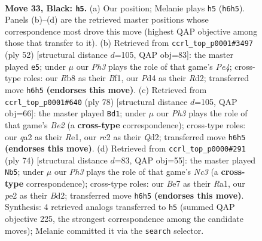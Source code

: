 \documentclass[11pt]{article}
\begin{document}
\clearpage

\begin{figure}[p]\centering
\begin{subfigure}{0.46\textwidth}\centering
\resizebox{\linewidth}{!}{%
\newchessgame
\chessboard[
  setfen={1rb3k1/p1nqbrn1/7p/P1p2p2/3p1Pp1/1P4P1/Q1R1P1BP/1RBNN1K1 b - - 5 33},
  showmover=false,
  pgfstyle=straightmove, color=movearrow, markmove={h6-h5}
]}
\caption{}
\end{subfigure}\hfill
\begin{subfigure}{0.46\textwidth}\centering
\resizebox{\linewidth}{!}{%
\newchessgame
\chessboard[
  setfen={5rk1/r2qbpp1/bnp1p2p/1p5P/3PPB2/p1P1N1P1/P1QR1P2/1R3BK1 w - - 6 27},
  showmover=false,
  pgfstyle=straightmove, color=movearrow, markmove={e4-e5}
]}
\caption{}
\end{subfigure}
\\[4pt]
\begin{subfigure}{0.46\textwidth}\centering
\resizebox{\linewidth}{!}{%
\newchessgame
\chessboard[
  setfen={r1q2nk1/3b1pb1/2pP2p1/r1p1P2p/1pP2P1P/5N2/PR1QBNK1/4R3 w - - 3 40},
  showmover=false,
  pgfstyle=straightmove, color=movearrow, markmove={e2-d1}
]}
\caption{}
\end{subfigure}\hfill
\begin{subfigure}{0.46\textwidth}\centering
\resizebox{\linewidth}{!}{%
\newchessgame
\chessboard[
  setfen={2rb1nk1/q2r1pp1/1pb1p2p/2p1P3/P1P2P1P/1RN3P1/3BQ2K/R4B2 w - - 3 38},
  showmover=false,
  pgfstyle=straightmove, color=movearrow, markmove={c3-b5}
]}
\caption{}
\end{subfigure}
\caption{\textbf{Move 33, Black: \texttt{h5}.} (a) Our position; Melanie plays \texttt{h5} (\texttt{h6h5}). Panels (b)--(d) are the retrieved master positions whose correspondence most drove this move (highest QAP objective among those that transfer to it). (b) Retrieved from \texttt{ccrl\_top\_p0001\#3497} (ply 52) [structural distance $d$=105, QAP obj=83]: the master played \texttt{e5}; under $\mu$ our \emph{Ph3} plays the role of that game's \emph{Pe4}; cross-type roles: our \emph{R}b8 as their \emph{B}f1, our \emph{P}d4 as their \emph{R}d2; transferred move \texttt{h6h5} \textbf{(endorses this move)}. (c) Retrieved from \texttt{ccrl\_top\_p0001\#640} (ply 78) [structural distance $d$=105, QAP obj=66]: the master played \texttt{Bd1}; under $\mu$ our \emph{Ph3} plays the role of that game's \emph{Be2} (a \textbf{cross-type} correspondence); cross-type roles: our \emph{q}a2 as their \emph{R}e1, our \emph{r}c2 as their \emph{Q}d2; transferred move \texttt{h6h5} \textbf{(endorses this move)}. (d) Retrieved from \texttt{ccrl\_top\_p0000\#291} (ply 74) [structural distance $d$=83, QAP obj=55]: the master played \texttt{Nb5}; under $\mu$ our \emph{Ph3} plays the role of that game's \emph{Nc3} (a \textbf{cross-type} correspondence); cross-type roles: our \emph{B}e7 as their \emph{R}a1, our \emph{p}e2 as their \emph{B}d2; transferred move \texttt{h6h5} \textbf{(endorses this move)}. Synthesis: 4 retrieved analogs transferred to \texttt{h5} (summed QAP objective 225, the strongest correspondence among the candidate moves); Melanie committed it via the \texttt{search} selector.}
\label{fig:thought-m65}
\end{figure}
\end{document}
